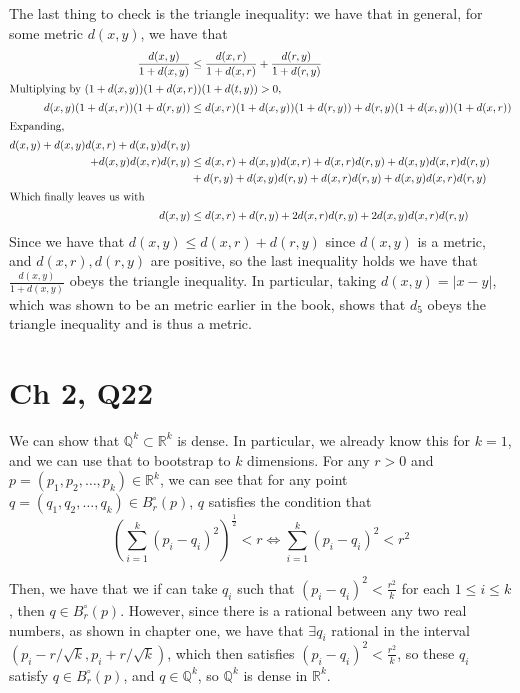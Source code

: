\documentclass[12pt,letterpaper]{article}
\theoremstyle{definition}
\newcommand{\R}{\mathbb{R}}
\newcommand{\Q}{\mathbb{Q}}
\begin{document}
The last thing to check is the triangle inequality: we have that in general, for some metric $d(x,y)$, we have that
\begin{align*}
  \frac{d(x,y)}{1+d(x,y)} &\leq \frac{d(x,r)}{1+d(x,r)} + \frac{d(r,y)}{1+d(r,y)} \\
  \intertext{Multiplying by $(1+d(x,y))(1+d(x,r))(1+d(t,y)) > 0$,}
  d(x,y)(1+d(x,r))(1+d(r,y)) &\leq d(x,r)(1+d(x,y))(1+d(r,y)) + d(r,y)(1+d(x,y))(1+d(x,r)) \\
  \intertext{Expanding,}
  d(x,y) + d(x,y)d(x,r) + d(x,y)d(r,y) &\\
  + d(x,y)d(x,r)d(r,y) &\leq d(x,r) + d(x,y)d(x,r) + d(x,r)d(r,y) + d(x,y)d(x,r)d(r,y) \\
                            &+ d(r,y) + d(x,y)d(r,y) + d(x,r)d(r,y) + d(x,y)d(x,r)d(r,y) \\
  \intertext{Which finally leaves us with}
  d(x,y) &\leq d(x,r) + d(r,y) + 2d(x,r)d(r,y) + 2d(x,y)d(x,r)d(r,y) \\
\end{align*}
Since we have that $d(x,y) \leq d(x,r) + d(r,y)$ since $d(x,y)$ is a metric, and $d(x,r), d(r,y)$ are positive, so the last inequality holds we have that $\frac{d(x,y)}{1+d(x,y)}$ obeys the triangle inequality. In particular, taking $d(x,y) = |x-y|$, which was shown to be an metric earlier in the book, shows that $d_{5}$ obeys the triangle inequality and is thus a metric.

\section*{Ch 2, Q22}

We can show that $\Q^{k} \subset \R^{k}$ is dense. In particular, we already know this for $k = 1$, and we can use that to bootstrap to $k$ dimensions. For any $r > 0$ and $p = (p_{1}, p_{2}, \dots, p_{k})\in \R^{k}$, we can see that for any point $q = (q_{1},q_{2},\dots,q_{k}) \in B_{r}^{\circ}(p)$, $q$ satisfies the condition that
\[
  \left(\sum_{i=1}^{k}(p_{i} - q_{i})^{2}\right)^{\frac{1}{2}} < r \iff \sum_{i=1}^{k}(p_{i} - q_{i})^{2} < r^{2}
\]

Then, we have that we if can take $q_{i}$ such that $(p_{i} - q_{i})^{2} < \frac{r^{2}}{k}$ for each $1 \leq i \leq k$, then $q \in B_{r}^{\circ}(p)$. However, since there is a rational between any two real numbers, as shown in chapter one, we have that $\exists q_{i}$ rational in the interval $(p_{i} - r / \sqrt{k}, p_{i} + r / \sqrt{k})$, which then satisfies $(p_{i} - q_{i})^{2} < \frac{r^{2}}{k}$, so these $q_{i}$ satisfy $q \in B_{r}^{\circ}(p)$, and $q \in \Q^{k}$, so $\Q^{k}$ is dense in $\R^{k}$.
\end{document}
